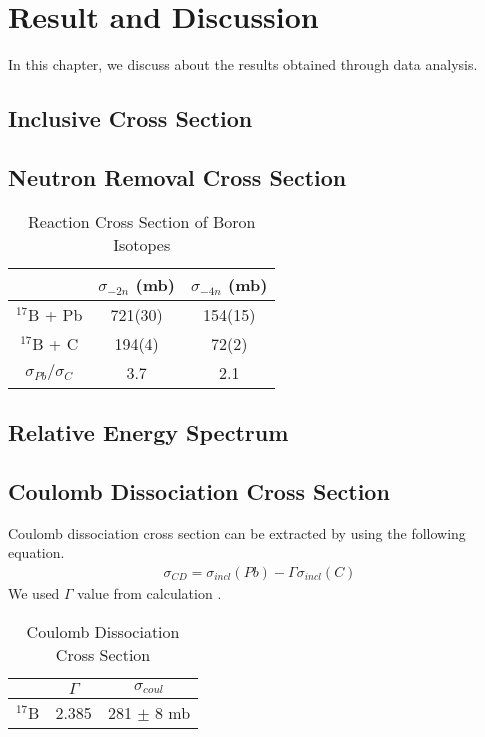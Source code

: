 \chapter{Result and Discussion}
In this chapter, we discuss about the results obtained through data analysis.
\section{Inclusive Cross Section}

\section{Neutron Removal Cross Section}
\begin{table}[h]
\centering
\begin{tabular}{c|c|c}
    \hline
     & $\sigma_{-2n}$ (mb) & $\sigma_{-4n}$ (mb) \\
    \hline
    $^{17}$B + Pb& 721(30) & 154(15)   \\ 
    $^{17}$B + C & 194(4) &  72(2) \\ \hline 
    $\sigma_{Pb}/\sigma_{C}$ & 3.7 & 2.1     \\ \hline
\end{tabular}
\caption{Reaction Cross Section of Boron Isotopes}
\label{tab:Reaction Cross Section of Boron Isotopes}

\end{table}

\section{Relative Energy Spectrum}

\section{Coulomb Dissociation Cross Section}
Coulomb dissociation cross section can be extracted by using the following equation.
\begin{align}
\sigma_{CD} = \sigma_{incl}(Pb) - \Gamma \sigma_{incl}(C)
\end{align}
We used $\Gamma$ value from calculation . 

\begin{table}
    \begin{tabular}[h]{c|c|c}
        \hline
        & $\Gamma$ & $\sigma_{coul}$   \\
        \hline
        $^{17}$B& 2.385 &   281 $\pm$ 8 mb \\ 
        \hline
    \end{tabular}
\caption{Coulomb Dissociation Cross Section}
\label{Coulomb Dissociation Cross Section}
\end{table}

